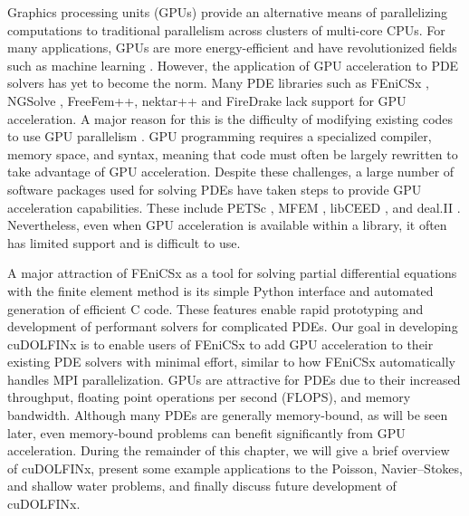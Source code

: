 Graphics processing units (GPUs) provide an alternative means of parallelizing computations to traditional parallelism across clusters of multi-core CPUs. For many applications, GPUs are more energy-efficient and have revolutionized fields such as machine learning \citep{navarro2014survey}. However, the application of GPU acceleration to PDE solvers has yet to become the norm. Many PDE libraries such as FEniCSx \citep{baratta2023dolfinx}, NGSolve \citep{schoberl2014c++}, FreeFem++\citep{hecht2012new}, nektar++ \citep{moxey2020nektar++} and FireDrake \citep{FiredrakeUserManual} lack support for GPU acceleration. A major reason for this is the difficulty of modifying existing codes to use GPU parallelism \citep{MILLS2021102831}. GPU programming requires a specialized compiler, memory space, and syntax, meaning that code must often be largely rewritten to take advantage of GPU acceleration. Despite these challenges, a large number of software packages used for solving PDEs have taken steps to provide GPU acceleration capabilities. These include PETSc \citep{MILLS2021102831}, MFEM \citep{anderson2021mfem}, libCEED \citep{abdelfattah2021gpu}, and deal.II \citep{arndt2021deal}. Nevertheless, even when GPU acceleration is available within a library, it often has limited support and is difficult to use.

A major attraction of FEniCSx \citep{baratta2023dolfinx} as a tool for solving partial differential equations with the finite element method is its simple Python interface and automated generation of efficient C code. These features enable rapid prototyping and development of performant solvers for complicated PDEs. Our goal in developing cuDOLFINx is to enable users of FEniCSx to add GPU acceleration to their existing PDE solvers with minimal effort, similar to how FEniCSx automatically handles MPI parallelization. GPUs are attractive for PDEs due to their increased throughput, floating point operations per second (FLOPS), and memory bandwidth. Although many PDEs are generally memory-bound, as will be seen later, even memory-bound problems can benefit significantly from GPU acceleration. During the remainder of this chapter, we will give a brief overview of cuDOLFINx, present some example applications to the Poisson, Navier--Stokes, and shallow water problems, and finally discuss future development of cuDOLFINx.

